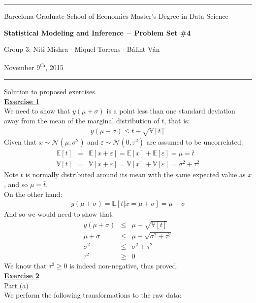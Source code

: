 \documentclass[a4paper, 11pt]{article}
\newcommand{\header}[4]{
	\begin{center}
		\rule{\linewidth}{0.5pt}
		
		{\small{#1}}
      
        \vspace{0.2in}
        
		{\large{#2}}
		
        \vspace{0.2in}
        
		{\small{#3}}
		
		\vspace{0.15in}
		
		{#4}
		
		\vspace{-0.1in}
		\rule{\linewidth}{0.6pt}
	\end{center}
}
\begin{document}
 
\header{\sc Barcelona Graduate School of Economics \hfill Master's Degree in Data Science}{\bf Statistical Modeling and Inference $-$ Problem Set \#4}{\sc Group 3: Niti Mishra $\cdot$ Miquel Torrens $\cdot$ B\'alint V\'an}{November 9\textsuperscript{th}, 2015}
Solution to proposed exercises.\\
\newline \textbf{\underline{Exercise 1}}\\
\newline We need to show that $y(\mu + \sigma)$ is a point less than one standard deviation away from the mean of the marginal distribution of $t$, that is:
\begin{eqnarray}
y(\mu + \sigma) \leq \bar{t} + \sqrt{\mathbb{V}[t]} \nonumber
\end{eqnarray}
Given that $x \sim \mathcal{N}(\mu, \sigma^2)$ and $\varepsilon \sim \mathcal{N}(0, \tau^2)$ are assumed to be uncorrelated:
\begin{eqnarray}
\mathbb{E}[t] &=& \mathbb{E}[x + \varepsilon] = \mathbb{E}[x] + \mathbb{E}[\varepsilon] = \mu = \bar{t} \nonumber \\
\mathbb{V}[t] &=& \mathbb{V}[x + \varepsilon] = \mathbb{V}[x] + \mathbb{V}[\varepsilon] = \sigma^2 + \tau^2 \nonumber
\end{eqnarray}
Note $t$ is normally distributed around its mean with the same expected value as $x$, and so $\mu = \bar{t}$.\\
\newline On the other hand:
\begin{eqnarray}
y(\mu + \sigma) = \mathbb{E}[t | x = \mu + \sigma] = \mu + \sigma \nonumber
\end{eqnarray}
And so we would need to show that:
\begin{eqnarray}
y(\mu + \sigma) &\leq& \mu + \sqrt{\mathbb{V}[t]} \nonumber \\
\mu + \sigma &\leq& \mu + \sqrt{\sigma^2 + \tau^2} \nonumber \\
\sigma^2 &\leq& \sigma^2 + \tau^2  \nonumber \\
\tau^2 &\geq& 0 \nonumber
\end{eqnarray}
We know that $\tau^2 \geq 0$ is indeed non-negative, thus proved.\\
\newpage
\textbf{\underline{Exercise 2}}\\
\newline \underline{Part (a)}\\
\newline We perform the following transformations to the raw data:
\end{document}
